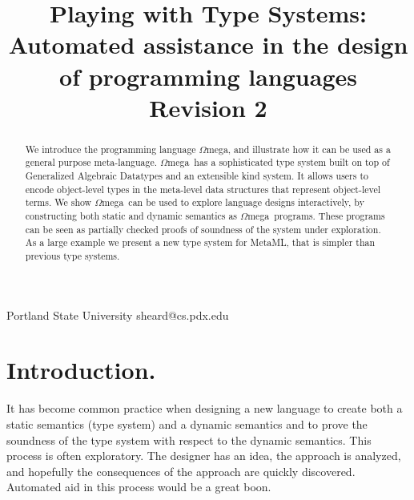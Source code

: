 \documentclass{sigplanconf}
\newcommand{\om}{$\Omega$mega}
\begin{document}
\title{Playing with Type Systems:\\
\large{Automated assistance in the design of programming languages}\\
\small{Revision 2}}

           {Portland State University}
           {sheard@cs.pdx.edu}
\maketitle

\begin{abstract} 

We introduce the programming language \om, and illustrate how it can be used
as a general purpose meta-language. \om\ has a sophisticated type system built
on top of Generalized Algebraic Datatypes and an extensible kind system. It
allows users to encode object-level types in the meta-level data structures
that represent object-level terms. We show \om\ can be used to explore
language designs interactively, by constructing both static and dynamic
semantics as \om\ programs. These programs can be seen as partially checked
proofs of soundness of the system under exploration. As a large example we
present a new type system for MetaML, that is simpler than previous type systems.


\end{abstract}


\section{Introduction.}\label{intro}
It has become common practice when designing a new language to create
both a static semantics (type system) and a dynamic semantics and to prove
the soundness of the type system with respect to the dynamic semantics.
This process is often exploratory. The designer has an idea,  the
approach is analyzed, and hopefully the consequences of the approach
are quickly discovered. Automated aid in this process would be a great boon.
\end{document}
